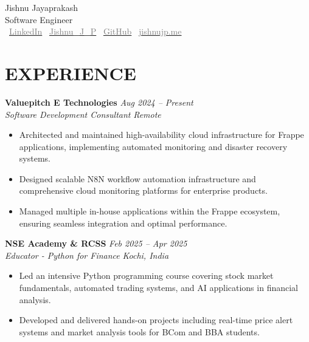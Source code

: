 \documentclass[11pt,a4paper]{article}
\begin{document}
\begin{center}
    {\LARGE Jishnu Jayaprakash} \\
    Software Engineer \\
    \faLinkedinSquare~\href{https://www.linkedin.com/in/jishnu-jayaprakash-813488156}{\textcolor{gray}{LinkedIn}} \quad
    \faTwitter~\href{https://x.com/Jishnu_J_P}{\textcolor{gray}{Jishnu\_J\_P}} \quad
    \faGithub~\href{https://github.com/jishnujp}{\textcolor{gray}{GitHub}} \quad
    \faGlobe~\href{https://jishnujp.me}{\textcolor{gray}{jishnujp.me}} \quad

\end{center}

\vspace{0.5em}

\section*{EXPERIENCE}

\textbf{Valuepitch E Technologies} \hfill \textit{Aug 2024 -- Present} \\
\textit{Software Development Consultant} \hfill \textit{Remote} \begin{itemize}[leftmargin=*]
    \item Architected and maintained high-availability cloud infrastructure for Frappe applications, implementing automated monitoring and disaster recovery systems.
    \item Designed scalable N8N workflow automation infrastructure and comprehensive cloud monitoring platforms for enterprise products.
    \item Managed multiple in-house applications within the Frappe ecosystem, ensuring seamless integration and optimal performance.
\end{itemize}


\textbf{NSE Academy \& RCSS} \hfill \textit{Feb 2025 -- Apr 2025} \\
\textit{Educator - Python for Finance} \hfill \textit{Kochi, India} \begin{itemize}[leftmargin=*]
    \item Led an intensive Python programming course covering stock market fundamentals, automated trading systems, and AI applications in financial analysis.
    \item Developed and delivered hands-on projects including real-time price alert systems and market analysis tools for BCom and BBA students.
\end{itemize}
\end{document}

